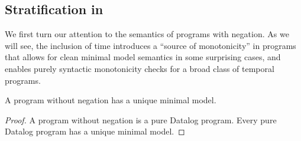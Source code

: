 
\subsection{Stratification in {\large{\bf\slang}}}
\label{sec:strat}
We first turn our attention to the semantics of
programs with negation.  As we will see, the inclusion of time introduces a
``source of monotonicity'' in programs that allows for clean minimal model
semantics in some surprising cases, and enables purely syntactic monotonicity
checks for a broad class of temporal programs.




\begin{lemma} \label{lemma:no-neg-unique}
%
A \slang program without negation 
has a unique minimal model.
%
\end{lemma}

\begin{proof} 
%
A \slang program without negation 
is a pure Datalog
program.  Every pure Datalog program has a unique minimal model. 
%
\end{proof}


